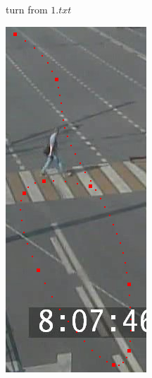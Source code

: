 \begin{figure}[!htb]
\begin{subfigure}[!htb]{0.32\textwidth}
		\caption{turn from $1.txt$}
	\end{subfigure}
	\hfill
	\begin{subfigure}[!htb]{0.25\textwidth}
		\centering{}
		\includegraphics[width=\textwidth]{images/rdp-n-curve.png}

\end{subfigure}
\end{figure}
